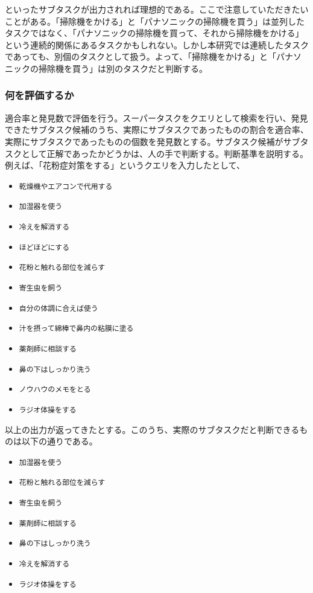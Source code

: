 \documentclass[submit,techreq]{ipsj}
\def\|{\verb|}
\begin{document}
といったサブタスクが出力されれば理想的である。ここで注意していただきたいことがある。「掃除機をかける」と「パナソニックの掃除機を買う」は並列したタスクではなく、「パナソニックの掃除機を買って、それから掃除機をかける」という連続的関係にあるタスクかもしれない。しかし本研究では連続したタスクであっても、別個のタスクとして扱う。よって、「掃除機をかける」と「パナソニックの掃除機を買う」は別のタスクだと判断する。

%5.1.2
\subsubsection{何を評価するか}
適合率と発見数で評価を行う。スーパータスクをクエリとして検索を行い、発見できたサブタスク候補のうち、実際にサブタスクであったものの割合を適合率、実際にサブタスクであったものの個数を発見数とする。サブタスク候補がサブタスクとして正解であったかどうかは、人の手で判断する。判断基準を説明する。例えば、「花粉症対策をする」というクエリを入力したとして、

\begin{itemize}
\item \|乾燥機やエアコンで代用する|
\item \|加湿器を使う|
\item \|冷えを解消する|
\item \|ほどほどにする|
\item \|花粉と触れる部位を減らす|
\item \|寄生虫を飼う|
\item \|自分の体調に合えば使う|
\item \|汁を摂って綿棒で鼻内の粘膜に塗る|
\item \|薬剤師に相談する|
\item \|鼻の下はしっかり洗う|
\item \|ノウハウのメモをとる|
\item \|ラジオ体操をする|
\end{itemize}

以上の出力が返ってきたとする。このうち、実際のサブタスクだと判断できるものは以下の通りである。

\begin{itemize}
\item \|加湿器を使う|
\item \|花粉と触れる部位を減らす|
\item \|寄生虫を飼う|
\item \|薬剤師に相談する|
\item \|鼻の下はしっかり洗う|
\item \|冷えを解消する|
\item \|ラジオ体操をする|
\end{itemize}
\end{document}
